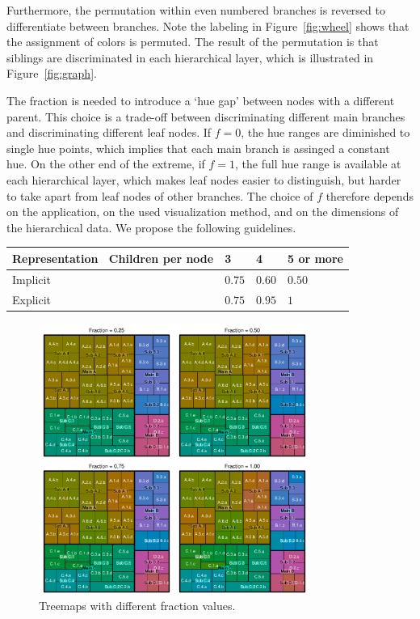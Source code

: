 \documentclass[journal]{vgtc}                %
\begin{document}
Furthermore, the permutation within even numbered branches is reversed to differentiate between branches. Note the labeling in Figure~\ref{fig:wheel} shows that the assignment of colors is permuted. The result of the permutation is that siblings are discriminated in each hierarchical layer, which is illustrated in Figure~\ref{fig:graph}.

The fraction is needed to introduce a `hue gap' between nodes with a different parent. This choice is a trade-off between discriminating different main branches and discriminating different leaf nodes. If $f=0$, the hue ranges are diminished to single hue points, which implies that each main branch is assinged a constant hue. On the other end of the extreme, if $f=1$, the full hue range is available at each hierarchical layer, which makes leaf nodes easier to distinguish, but harder to take apart from leaf nodes of other branches.
The choice of $f$ therefore depends on the application, on the used visualization method, and on the dimensions of the hierarchical data. 
We propose the following guidelines.

\begin{tabular}{llll} 
\toprule 
Representation \ Children per node & 3 & 4 & 5 or more\\ 
\midrule 
Implicit & $0.75$ & $0.60$ & $0.50$ \\ 
Explicit & $0.75$ & $0.95$ & $1$ \\ 
\bottomrule 
\end{tabular}



\begin{figure}[htb]
  \centering
  \includegraphics[width=3.5in]{Treemaps_hue.pdf}
  \caption{Treemaps with different fraction values.}\label{fig:treemapf}
\end{figure}
\end{document}
